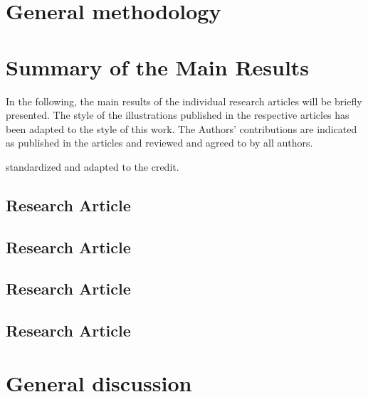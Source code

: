 \documentclass{book}
\newcommand{\uproman}[1]{\uppercase\expandafter{\romannumeral#1}}
\begin{document}
\chapter{General methodology}
\label{chap:methods}


\chapter{Summary of the Main Results}
In the following, the main results of the individual research articles will be briefly presented. The style of the illustrations published in the respective articles has been adapted to the style of this work. The Authors' contributions are indicated as published in the articles and reviewed and agreed to by all authors.

standardized and adapted to the \gls{credit}. 
\label{chap:results}
    \section{Research Article \uproman{1}}
    \label{results:paperI}
    
    
    \section{Research Article \uproman{2}}
    \label{results:paperII}
    

    \section{Research Article \uproman{3}}
    \label{results:paperIII}
    
    
    \section{Research Article \uproman{4}}
    \label{results:paperIV}
    
    
\chapter{General discussion}
\label{chap:discussion}

\printbibliography[heading=bibintoc,title={References}]

\chapter*{\vspace*{\fill}\vspace*{\fill}}
\label{pub:papers}
    \newpage
\end{document}
